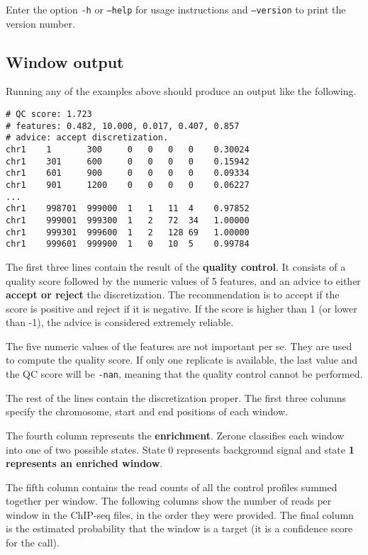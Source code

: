 \documentclass[12pt]{article}
\begin{document}
Enter the option \texttt{-h} or \texttt{--help} for usage instructions and
\texttt{--version} to print the version number.

\subsection{Window output}

Running any of the examples above should produce an output like
the following.

\begin{verbatim}
# QC score: 1.723
# features: 0.482, 10.000, 0.017, 0.407, 0.857
# advice: accept discretization.
chr1    1       300     0   0   0   0    0.30024
chr1    301     600     0   0   0   0    0.15942
chr1    601     900     0   0   0   0    0.09334
chr1    901     1200    0   0   0   0    0.06227
...
chr1    998701  999000  1   1   11  4    0.97852
chr1    999001  999300  1   2   72  34   1.00000
chr1    999301  999600  1   2   128 69   1.00000
chr1    999601  999900  1   0   10  5    0.99784
\end{verbatim}

\begin{mdframed}
The first three lines contain the result of the \textbf{quality control}.
It consists of a quality score followed by the numeric values of 5
features, and an advice to either \textbf{accept or reject} the
discretization. The recommendation is to accept if the score is positive
and reject if it is negative. If the score is higher than 1 (or lower
than -1), the advice is considered extremely reliable.
\end{mdframed}

The five numeric values of the features are not important per se.
They are used to compute the quality score. If only one replicate is
available, the last value and the QC score will be \texttt{-nan},
meaning that the quality control cannot be performed.

The rest of the lines contain the discretization proper.
The first three columns specify the chromosome, start and end
positions of each window.

\begin{mdframed}
The fourth column represents the \textbf{enrichment}. Zerone classifies
each window into one of two possible states. State 0 represents
background signal and state \textbf{1 represents an enriched window}.
\end{mdframed}

The fifth column contains the read counts of all the control profiles
summed together per window. The following columns show the number of
reads per window in the ChIP-seq files, in the order they were provided.
The final column is the estimated probability that the window is a
target (it is a confidence score for the call).
\end{document}
